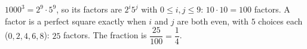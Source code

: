 $1000^3=2^9\cdot5^9$, so its factors are $2^i5^j$ with $0\le i,j\le9$: $10\cdot10=100$ factors. A factor is a perfect square exactly when $i$ and $j$ are both even, with $5$ choices each ($0,2,4,6,8$): $25$ factors. The fraction is $\dfrac{25}{100}=\boxed{\dfrac{1}{4}}$.
